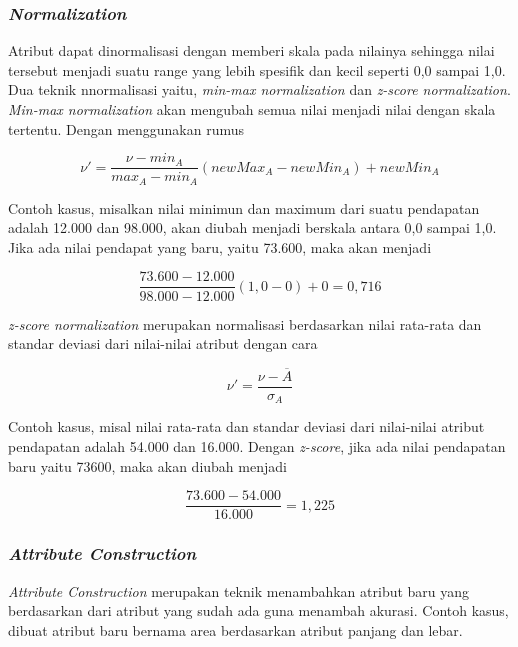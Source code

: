 \subsubsection{\textsl{Normalization}}
Atribut dapat dinormalisasi dengan memberi skala pada nilainya sehingga nilai tersebut menjadi suatu range yang lebih spesifik dan kecil seperti 0,0 sampai 1,0.
Dua teknik nnormalisasi yaitu, \textsl{min-max normalization} dan \textsl{z-score normalization}. \textsl{Min-max normalization} akan mengubah semua nilai menjadi nilai dengan skala tertentu. Dengan menggunakan rumus 

\begin{displaymath}
	\nu' = \frac{\nu-min_{A}}{max_{A}-min_{A}}(newMax_{A}-newMin_{A})+newMin_{A}	
\end{displaymath}

Contoh kasus, misalkan nilai minimun dan maximum dari suatu pendapatan adalah 12.000 dan 98.000, akan diubah menjadi berskala antara 0,0 sampai 1,0. Jika ada nilai pendapat yang baru, yaitu 73.600, maka akan menjadi

\begin{displaymath}
\frac{73.600-12.000}{98.000-12.000} (1,0-0)+0 = 0,716
\end{displaymath}

\textsl{z-score normalization} merupakan normalisasi berdasarkan nilai rata-rata dan standar deviasi dari nilai-nilai atribut dengan cara

\begin{displaymath}
\nu' = \frac{\nu-\overline{A}}{\sigma_{A}}
\end{displaymath}

Contoh kasus, misal nilai rata-rata dan standar deviasi dari nilai-nilai atribut pendapatan adalah 54.000 dan 16.000. Dengan \textsl{z-score}, jika ada nilai pendapatan baru yaitu 73600, maka akan diubah menjadi

\begin{displaymath}
\frac{73.600-54.000}{16.000} = 1,225 
\end{displaymath}

\subsubsection{\textsl{Attribute Construction}}
\textsl{Attribute Construction} merupakan teknik menambahkan atribut baru yang berdasarkan dari atribut yang sudah ada guna menambah akurasi. Contoh kasus, dibuat atribut baru bernama area berdasarkan atribut panjang dan lebar. 

